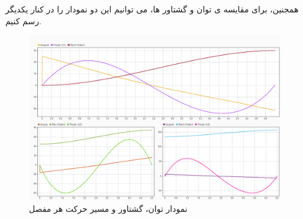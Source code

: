 همجنین، برای مقایسه ی توان و گشتاور ها، می توانیم این دو نمودار را در کنار یکدیگر رسم کنیم.
\begin{figure}[H]
	\centering
	\includegraphics[width=1\linewidth]{../img/23}
	\caption{نمودار توان، گشتاور و مسیر حرکت هر مفصل}
	\label{fig:23}
\end{figure}























